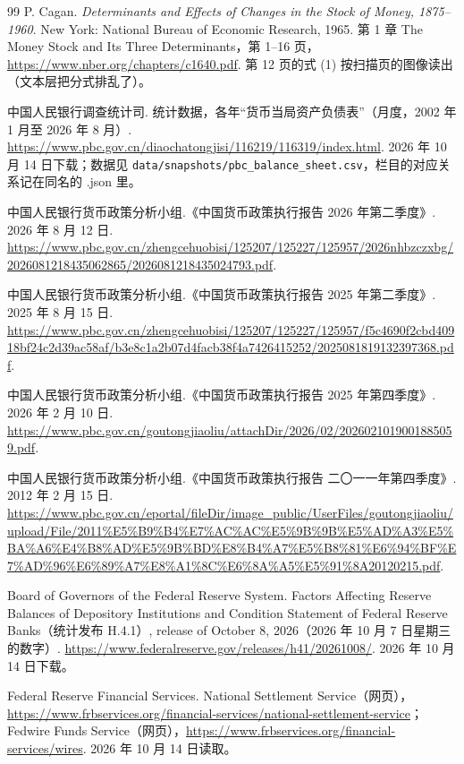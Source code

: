 \begin{thebibliography}{99}
 P. Cagan. \emph{Determinants and Effects of Changes in the Stock of Money, 1875--1960}. New York: National Bureau of Economic Research, 1965. 第 1 章 The Money Stock and Its Three Determinants，第 1--16 页，\url{https://www.nber.org/chapters/c1640.pdf}. 第 12 页的式 (1) 按扫描页的图像读出（文本层把分式排乱了）。

 中国人民银行调查统计司. 统计数据，各年“货币当局资产负债表”（月度，2002 年 1 月至 2026 年 8 月）. \url{https://www.pbc.gov.cn/diaochatongjisi/116219/116319/index.html}. 2026 年 10 月 14 日下载；数据见 \texttt{data/snapshots/pbc\_balance\_sheet.csv}，栏目的对应关系记在同名的 .json 里。

 中国人民银行货币政策分析小组.《中国货币政策执行报告 2026 年第二季度》. 2026 年 8 月 12 日. \url{https://www.pbc.gov.cn/zhengcehuobisi/125207/125227/125957/2026nhbzczxbg/2026081218435062865/2026081218435024793.pdf}.

 中国人民银行货币政策分析小组.《中国货币政策执行报告 2025 年第二季度》. 2025 年 8 月 15 日. \url{https://www.pbc.gov.cn/zhengcehuobisi/125207/125227/125957/f5c4690f2cbd40918bf24c2d39ac58af/b3e8c1a2b07d4facb38f4a7426415252/2025081819132397368.pdf}.

 中国人民银行货币政策分析小组.《中国货币政策执行报告 2025 年第四季度》. 2026 年 2 月 10 日. \url{https://www.pbc.gov.cn/goutongjiaoliu/attachDir/2026/02/2026021019001885059.pdf}.

 中国人民银行货币政策分析小组.《中国货币政策执行报告 二〇一一年第四季度》. 2012 年 2 月 15 日. \url{https://www.pbc.gov.cn/eportal/fileDir/image_public/UserFiles/goutongjiaoliu/upload/File/2011\%E5\%B9\%B4\%E7\%AC\%AC\%E5\%9B\%9B\%E5\%AD\%A3\%E5\%BA\%A6\%E4\%B8\%AD\%E5\%9B\%BD\%E8\%B4\%A7\%E5\%B8\%81\%E6\%94\%BF\%E7\%AD\%96\%E6\%89\%A7\%E8\%A1\%8C\%E6\%8A\%A5\%E5\%91\%8A20120215.pdf}.

 Board of Governors of the Federal Reserve System. Factors Affecting Reserve Balances of Depository Institutions and Condition Statement of Federal Reserve Banks（统计发布 H.4.1）, release of October 8, 2026（2026 年 10 月 7 日星期三的数字）. \url{https://www.federalreserve.gov/releases/h41/20261008/}. 2026 年 10 月 14 日下载。

 Federal Reserve Financial Services. National Settlement Service（网页），\url{https://www.frbservices.org/financial-services/national-settlement-service}；Fedwire Funds Service（网页），\url{https://www.frbservices.org/financial-services/wires}. 2026 年 10 月 14 日读取。


\end{thebibliography}
